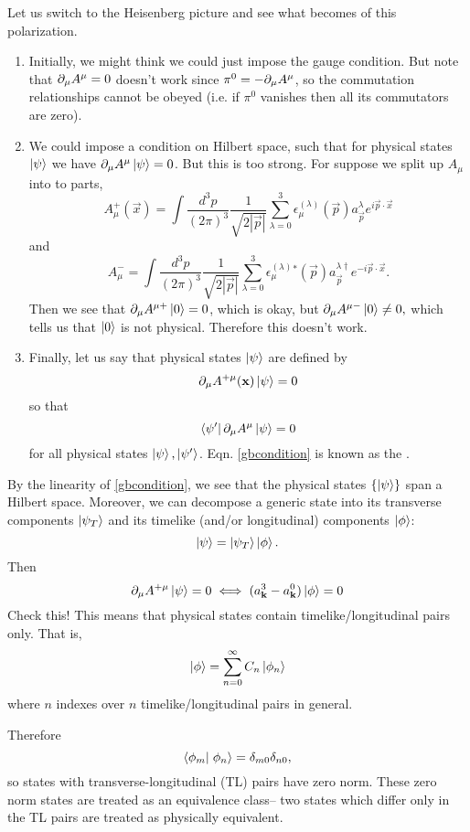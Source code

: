 Let us switch to the Heisenberg picture and see what becomes of this polarization.
\begin{enumerate}
    \item Initially, we might think we could just impose the gauge condition. But note that $\partial_\mu A^\mu=0$ doesn't work since $\pi^0 = -\partial_\mu A^\mu$, so the commutation relationships cannot be obeyed (i.e. if $\pi^0$ vanishes then all its commutators are zero).
    \item We could impose a condition on Hilbert space, such that for physical states $\left| \psi \right>$ we have $\partial_\mu A^\mu\left| \psi \right>=0$. But this is too strong. For suppose we split up $A_\mu$ into to parts,
    $$A_\mu^+(\vec x)=\int \frac{d^3p}{(2\pi)^3} \frac{1}{\sqrt{2|\vec p|}} \sum_{\lambda=0}^3 \epsilon_\mu^{(\lambda)}(\vec p) a_{\vec p}^\lambda e^{i \vec p \cdot \vec x}$$
    and
    $$A_\mu^-=\int \frac{d^3p}{(2\pi)^3} \frac{1}{\sqrt{2|\vec p|}} \sum_{\lambda=0}^3 \epsilon_\mu^{(\lambda)}{}^* (\vec p) a_{\vec p}^{\lambda \dagger} e^{-i\vec p \cdot \vec x}.$$
    Then we see that $\partial_\mu A^{\mu+}\left| 0 \right>=0$, which is okay, but $\partial_\mu A^{\mu-}\left| 0 \right>\neq 0,$ which tells us that $\left| 0 \right>$ is not physical. Therefore this doesn't work.
    \item Finally, let us say that physical states $\left| \psi \right>$ are defined by
    \begin{equation}\label{gbcondition}
        \partial_\mu A^{+\mu}(\boldsymbol{\mathbf{x}})\left| \psi \right>=0
    \end{equation}
    so that
    $$\left< \psi' \right|\partial_\mu A^\mu \left| \psi \right>=0$$
    for all physical states $\left| \psi \right>,\left| \psi' \right>$. Eqn. \ref{gbcondition} is known as the .
\end{enumerate}
By the linearity of \ref{gbcondition}, we see that the physical states $\{\left| \psi \right>\}$ span a Hilbert space. Moreover, we can decompose a generic state into its transverse components $\left| \psi_T \right>$ and its timelike (and/or longitudinal) components $\left| \phi \right>$:
$$\left| \psi \right>=\left| \psi_T \right>\left| \phi \right>.$$
Then
$$\partial_\mu A^{+\mu}\left| \psi \right>=0 \iff (a_{\boldsymbol{\mathbf{k}}}^3- a_{\boldsymbol{\mathbf{k}}}^0)\left| \phi \right>=0$$
Check this! This means that physical states contain timelike/longitudinal pairs only. That is,
$$\left| \phi \right>=\sum_{n=0}^\infty C_n \left| \phi_n \right>$$
where $n$ indexes over $n$ timelike/longitudinal pairs in general.%

Therefore
$$\braket{\phi_m}{\phi_n}=\delta_{m0}\delta_{n0},$$ so states with transverse-longitudinal (TL) pairs have zero norm. These zero norm states are treated as an equivalence class-- two states which differ only in the TL pairs are treated as physically equivalent.

